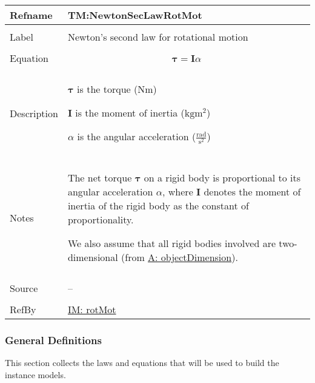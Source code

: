 \documentclass[12pt]{article}
\begin{document}
\vspace{\baselineskip}
\noindent
\begin{minipage}{\textwidth}
\begin{tabular}{>{\raggedright}p{}>{\raggedright\arraybackslash}p{}}
\toprule \textbf{Refname} & \textbf{TM:NewtonSecLawRotMot}
\label{TM:NewtonSecLawRotMot}
\\ \midrule \\
Label & Newton's second law for rotational motion
        
\\ \midrule \\
Equation & \begin{displaymath}
           \mathbf{τ}=\mathbf{I} α
           \end{displaymath}
\\ \midrule \\
Description & \begin{symbDescription}
              \item{$\mathbf{τ}$ is the torque ($\text{N}\text{m}$)}
              \item{$\mathbf{I}$ is the moment of inertia ($\text{kg}\text{m}^{2}$)}
              \item{$α$ is the angular acceleration ($\frac{\text{rad}}{\text{s}^{2}}$)}
              \end{symbDescription}
\\ \midrule \\
Notes & The net torque $\mathbf{τ}$ on a rigid body is proportional to its angular acceleration $α$, where $\mathbf{I}$ denotes the moment of inertia of the rigid body as the constant of proportionality.
        
        We also assume that all rigid bodies involved are two-dimensional (from \hyperref[assumpOD]{A: objectDimension}).
        
\\ \midrule \\
Source & --
         
\\ \midrule \\
RefBy & \hyperref[IM:rotMot]{IM: rotMot}
        
\\ \bottomrule
\end{tabular}
\end{minipage}
\subsubsection{General Definitions}
\label{Sec:GDs}
This section collects the laws and equations that will be used to build the instance models.
\end{document}
